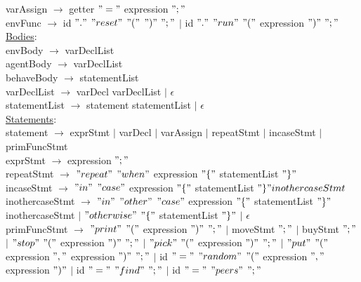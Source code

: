 \documentclass{article}
\begin{document}
varAssign $\rightarrow$ getter $"="$ expression $";"$ \\

envFunc $\rightarrow$ id $"."$ $"reset"$ $"("$ $")"$ $";"$ $\vert$ id $"."$ $"run"$ $"("$ expression $")"$ $";"$\\

\underline{Bodies}: \\

envBody $\rightarrow$ varDeclList \\

agentBody $\rightarrow$ varDeclList \\

behaveBody $\rightarrow$ statementList \\

varDeclList $\rightarrow$ varDecl varDeclList $\vert$ $\epsilon$ \\

statementList $\rightarrow$ statement statementList $\vert$ $\epsilon$ \\

\underline{Statements}: \\

statement $\rightarrow$ exprStmt $\vert$ varDecl $\vert$ varAssign $\vert$ repeatStmt $\vert$ incaseStmt $\vert$ primFuncStmt\\

exprStmt $\rightarrow$ expression $";"$ \\

repeatStmt $\rightarrow$ $"repeat"$  $"when"$  expression $"\{"$ statementList  $"\}"$ \\

incaseStmt $\rightarrow$  $"in"$  $"case"$ expression $"\{"$ statementList  $"\}" inothercaseStmt$\\

inothercaseStmt $\rightarrow$  $"in"$ $"other"$  $"case"$ expression $"\{"$ statementList  $"\}"$ inothercaseStmt $\vert$ $"otherwise"$ $"\{"$ statementList  $"\}"$ $\vert$ $\epsilon$ \\  

primFuncStmt $\rightarrow$ $"print"$ $"("$ expression $")"$ $";"$  $\vert$  moveStmt $";"$ $\vert$ buyStmt $";"$ $\vert$ $"stop"$ $"("$ expression $")"$ $";"$ $\vert$ $"pick"$ $"("$ expression $")"$ $";"$ $\vert$ $"put"$ $"("$ expression $","$ expression $")"$ $";"$ $\vert$ id $"="$ $"random"$ $"("$ expression $","$ expression $")"$ $\vert$ id $"="$ $"find"$ $";"$ $\vert$ id $"="$ $"peers"$ $";"$\\
\end{document}
